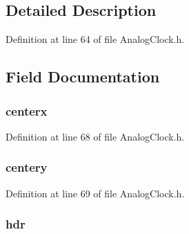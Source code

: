 \subsection{Detailed Description}


Definition at line 64 of file Analog\+Clock.\+h.



\subsection{Field Documentation}
\hypertarget{struct_a_n_a_l_o_g_c_l_o_c_k_a8cbdf3f0f53a2e47e828ed9f505ce91e}{}
\subsubsection[{centerx}]{ centerx}\label{struct_a_n_a_l_o_g_c_l_o_c_k_a8cbdf3f0f53a2e47e828ed9f505ce91e}


Definition at line 68 of file Analog\+Clock.\+h.

\hypertarget{struct_a_n_a_l_o_g_c_l_o_c_k_a3ebcb7099606a53c6ebb35c64c9cac8b}{}
\subsubsection[{centery}]{ centery}\label{struct_a_n_a_l_o_g_c_l_o_c_k_a3ebcb7099606a53c6ebb35c64c9cac8b}


Definition at line 69 of file Analog\+Clock.\+h.

\hypertarget{struct_a_n_a_l_o_g_c_l_o_c_k_abeffaf353197a8a64fba6707b68ce0be}{}
\subsubsection[{hdr}]{ hdr}\label{struct_a_n_a_l_o_g_c_l_o_c_k_abeffaf353197a8a64fba6707b68ce0be}



